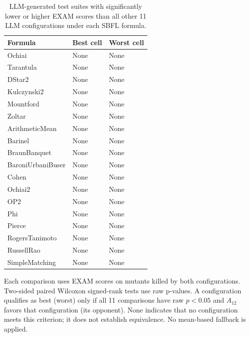\begin{table}[t]
\centering
\caption{LLM-generated test suites with significantly lower or higher EXAM scores than all other 11 LLM configurations under each SBFL formula.}
\label{tab:rq3bw-selection}
\begin{tabular}{lll}
\hline
Formula & Best cell & Worst cell \\
\hline
Ochiai & None & None \\
Tarantula & None & None \\
DStar2 & None & None \\
Kulczynski2 & None & None \\
Mountford & None & None \\
Zoltar & None & None \\
ArithmeticMean & None & None \\
Barinel & None & None \\
BraunBanquet & None & None \\
BaroniUrbaniBuser & None & None \\
Cohen & None & None \\
Ochiai2 & None & None \\
OP2 & None & None \\
Phi & None & None \\
Pierce & None & None \\
RogersTanimoto & None & None \\
RussellRao & None & None \\
SimpleMatching & None & None \\
\hline
\end{tabular}
\par\smallskip
\begin{minipage}{\linewidth}\footnotesize Each comparison uses EXAM scores on mutants killed by both configurations. Two-sided paired Wilcoxon signed-rank tests use raw p-values. A configuration qualifies as best (worst) only if all 11 comparisons have raw $p<0.05$ and $A_{12}$ favors that configuration (its opponent). None indicates that no configuration meets this criterion; it does not establish equivalence. No mean-based fallback is applied.
\end{minipage}
\end{table}
